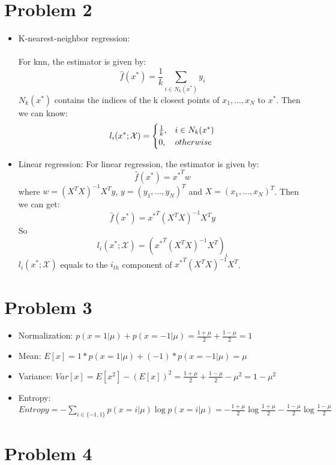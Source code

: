 \documentclass[twoside]{article}
\begin{document}
\section{Problem 2}
\begin{itemize}
\item K-nearest-neighbor regression:
\paragraph{} For knn, the estimator is given by:
$$\hat f(x^*)= \frac{1}{k}\sum_{i\in N_k(x^*)}y_i$$
$N_k(x^*)$ contains the indices of the k closest points of $x_1,\dots,x_N$ to $x^*$.
Then we can know:
\begin{eqnarray}
l_i(x^*; \mathcal{X})=
\begin{cases}
\frac{1}{k}, & i\in N_k(x^*)\cr
 0, & otherwise 
 \end{cases}
\end{eqnarray}

\item Linear regression:
For linear regression, the estimator is given by:
$$\hat f(x^*) = {x^*}^Tw$$
where $w = (X^TX)^{-1}X^Ty$, $y=(y_1, \dots, y_N)^T$ and $X=(x_1,\dots, x_N)^T$. Then we can get:
$$\hat f(x^*) = {x^*}^T(X^TX)^{-1}X^Ty$$
So $$l_i(x^*; \mathcal{X}) =  ({x^*}^T(X^TX)^{-1}X^T)_i$$
$l_i(x^*; \mathcal{X})$ equals to the $i_{th}$ component of ${x^*}^T(X^TX)^{-1}X^T$.

\end{itemize}


\section{Problem 3}
\begin{itemize}
\item Normalization: $p(x=1|\mu)+p(x=-1|\mu) = \frac{1+\mu}{2}+\frac{1-\mu}{2}=1$
\item Mean:  $E[x]=1*p(x=1|\mu) + (-1)*p(x=-1|\mu)=\mu$
\item Variance: $Var[x]=E[x^2]-(E[x])^2 = \frac{1+\mu}{2}+\frac{1-\mu}{2} - \mu^2 = 1-\mu^2$
\item Entropy: $Entropy = -\sum_{i\in \{-1, 1\}} p(x=i|\mu) \log p(x=i|\mu) = - \frac{1+\mu}{2}\log \frac{1+\mu}{2}- \frac{1-\mu}{2}\log \frac{1-\mu}{2}$
\end{itemize}

\section{Problem 4}
\end{document}
